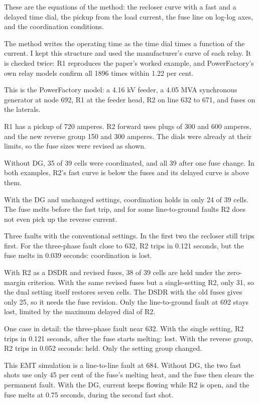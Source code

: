 \documentclass[11pt,a4paper]{article}
\newcommand{\slide}[2]{\par\vspace{4.5pt}\noindent
  \makebox[0.95cm][r]{\fontsize{13}{15}\selectfont\bfseries\color{navy}#1}\hspace{0.3cm}%
  \parbox[t]{\dimexpr\linewidth-1.25cm}{\fontsize{11.3}{14.3}\selectfont\raggedright #2}\par}
\begin{document}
\slide{8}{These are the equations of the method: the recloser curve with a fast and a delayed time dial, the pickup from the load current, the fuse line on log-log axes, and the coordination conditions.}

\slide{9}{The method writes the operating time as the time dial times a function of the current. I kept this structure and used the manufacturer's curve of each relay. It is checked twice: R1 reproduces the paper's worked example, and PowerFactory's own relay models confirm all 1896 times within 1.22 per cent.}

\slide{10}{This is the PowerFactory model: a 4.16 kV feeder, a 4.05 MVA synchronous generator at node 692, R1 at the feeder head, R2 on line 632 to 671, and fuses on the laterals.}

\slide{11}{R1 has a pickup of 720 amperes. R2 forward uses plugs of 300 and 600 amperes, and the new reverse group 150 and 300 amperes. The dials were already at their limits, so the fuse sizes were revised as shown.}

\slide{12}{Without DG, 35 of 39 cells were coordinated, and all 39 after one fuse change. In both examples, R2's fast curve is below the fuses and its delayed curve is above them.}

\slide{13}{With the DG and unchanged settings, coordination holds in only 24 of 39 cells. The fuse melts before the fast trip, and for some line-to-ground faults R2 does not even pick up the reverse current.}

\slide{14}{Three faults with the conventional settings. In the first two the recloser still trips first. For the three-phase fault close to 632, R2 trips in 0.121 seconds, but the fuse melts in 0.039 seconds: coordination is lost.}

\slide{15}{With R2 as a DSDR and revised fuses, 38 of 39 cells are held under the zero-margin criterion. With the same revised fuses but a single-setting R2, only 31, so the dual setting itself restores seven cells. The DSDR with the old fuses gives only 25, so it needs the fuse revision. Only the line-to-ground fault at 692 stays lost, limited by the maximum delayed dial of R2.}

\slide{16}{One case in detail: the three-phase fault near 632. With the single setting, R2 trips in 0.121 seconds, after the fuse starts melting: lost. With the reverse group, R2 trips in 0.052 seconds: held. Only the setting group changed.}

\slide{17}{This EMT simulation is a line-to-line fault at 684. Without DG, the two fast shots use only 45 per cent of the fuse's melting heat, and the fuse then clears the permanent fault. With the DG, current keeps flowing while R2 is open, and the fuse melts at 0.75 seconds, during the second fast shot.}
\end{document}
